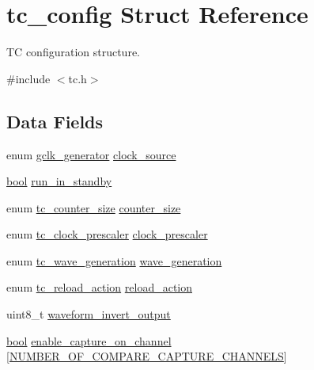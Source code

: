 \hypertarget{structtc__config}{}\section{tc\+\_\+config Struct Reference}
\label{structtc__config}


TC configuration structure.  




{\ttfamily \#include $<$tc.\+h$>$}

\subsection*{Data Fields}
\begin{DoxyCompactItemize}
\item 
enum \mbox{\hyperlink{group__asfdoc__sam0__system__clock__group_ga1ab9bb87560ad127ed982591b7d67311}{gclk\+\_\+generator}} \mbox{\hyperlink{structtc__config_a07b9a1a157ab9a693f45af19a8206fc0}{clock\+\_\+source}}
\item 
\mbox{\hyperlink{group__group__sam0__utils_ga97a80ca1602ebf2303258971a2c938e2}{bool}} \mbox{\hyperlink{structtc__config_a514964d5c2a8da4dd96bac82a53477f2}{run\+\_\+in\+\_\+standby}}
\item 
enum \mbox{\hyperlink{group__asfdoc__sam0__tc__group_ga1b112627b81227c49c16b1a93e3321a0}{tc\+\_\+counter\+\_\+size}} \mbox{\hyperlink{structtc__config_aab0e5adb1f12875949e072f548ce2895}{counter\+\_\+size}}
\item 
enum \mbox{\hyperlink{group__asfdoc__sam0__tc__group_ga98aed17b995157e67b9322a45f0ed5f4}{tc\+\_\+clock\+\_\+prescaler}} \mbox{\hyperlink{structtc__config_a4951355c92f0839f9e046d508bf33d6d}{clock\+\_\+prescaler}}
\item 
enum \mbox{\hyperlink{group__asfdoc__sam0__tc__group_gae7f1302b7e3d675e471a554668b49d64}{tc\+\_\+wave\+\_\+generation}} \mbox{\hyperlink{structtc__config_a5432728b0097b7ac87b9b44b63c62419}{wave\+\_\+generation}}
\item 
enum \mbox{\hyperlink{group__asfdoc__sam0__tc__group_ga204bb4814c91e62e56d9297c05280aad}{tc\+\_\+reload\+\_\+action}} \mbox{\hyperlink{structtc__config_afbdfe6d99d0fd254c2cf61ecf212aa3f}{reload\+\_\+action}}
\item 
uint8\+\_\+t \mbox{\hyperlink{structtc__config_ac9b73d7649d962c76954cc26aebe6f66}{waveform\+\_\+invert\+\_\+output}}
\item 
\mbox{\hyperlink{group__group__sam0__utils_ga97a80ca1602ebf2303258971a2c938e2}{bool}} \mbox{\hyperlink{structtc__config_a37f9675f40e6cfd537b084547f489154}{enable\+\_\+capture\+\_\+on\+\_\+channel}} \mbox{[}\mbox{\hyperlink{group__asfdoc__sam0__tc__group_gac837f9db5df1793578c195a979c6a9d3}{N\+U\+M\+B\+E\+R\+\_\+\+O\+F\+\_\+\+C\+O\+M\+P\+A\+R\+E\+\_\+\+C\+A\+P\+T\+U\+R\+E\+\_\+\+C\+H\+A\+N\+N\+E\+LS}}\mbox{]}

\end{DoxyCompactItemize}
